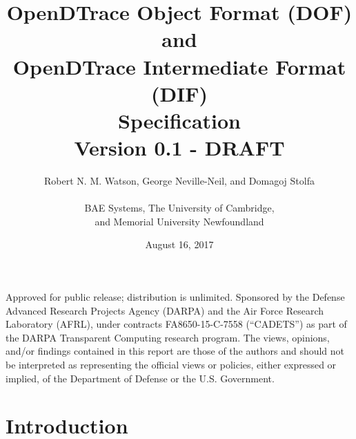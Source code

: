 


\title{OpenDTrace Object Format (DOF) and \\
  OpenDTrace Intermediate Format (DIF) \\
  Specification \\
  {\large Version 0.1 - DRAFT}
}

\date{August 16, 2017}

\author{
  Robert N. M. Watson, George Neville-Neil, and Domagoj Stolfa \\
  \\
  BAE Systems, The University of Cambridge, \\
    and Memorial University Newfoundland
}

\begin{minipage}[h]{\textwidth}
  \maketitle

  \vspace{2in}
  {\small
  Approved for public release; distribution is unlimited.
  Sponsored by the Defense Advanced Research Projects Agency (DARPA) and the
  Air Force Research Laboratory (AFRL), under contracts FA8650-15-C-7558
  (``CADETS'') as part of the DARPA Transparent Computing research program.
  The views, opinions, and/or findings contained in this report are those of the
  authors and should not be interpreted as representing the official views or
  policies, either expressed or implied, of the Department of Defense
  or the U.S. Government.}
\end{minipage}

\normalsize



\clearpage



\clearpage



\clearpage

\tableofcontents

\clearpage

\chapter{Introduction}
\label{chap:introduction}



